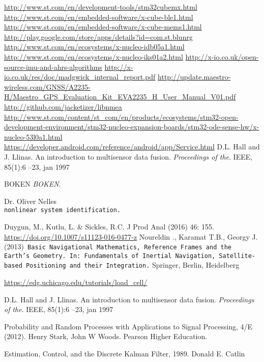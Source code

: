 \begin{thebibliography}{9}
\label{sec:ref}

  \url{http://www.st.com/en/development-tools/stm32cubemx.html}
  \url{http://www.st.com/en/embedded-software/x-cube-ble1.html}
  \url{http://www.st.com/en/embedded-software/x-cube-mems1.html}
  \url{http://play.google.com/store/apps/details?id=com.st.blunrg}
  \url{http://www.st.com/en/ecosystems/x-nucleo-idb05a1.html}
  \url{http://www.st.com/en/ecosystems/x-nucleo-iks01a2.html}
  \url{http://x-io.co.uk/open-source-imu-and-ahrs-algorithms}
  \url{http://x-io.co.uk/res/doc/madgwick_internal_report.pdf}
  \url{http://update.maestro-wireless.com/GNSS/A2235-H/Maestro_GPS_Evaluation_Kit_EVA2235_H_User_Manual_V01.pdf}
  \url{http://github.com/jacketizer/libnmea}
  \url{http://www.st.com/content/st_com/en/products/ecosystems/stm32-open-development-environment/stm32-nucleo-expansion-boards/stm32-ode-sense-hw/x-nucleo-53l0a1.html}
  \url{https://developer.android.com/reference/android/app/Service.html}
D.L. Hall and J. Llinas. An introduction to multisensor data fusion. 
\textit{Proceedings of the}. IEEE, 85(1):6 –23, jan 1997

 
BOKEN
\textit{BOKEN}. 

 
Dr. Oliver Nelles
\\\texttt{nonlinear system identification.}

Duygun, M., Kutlu, L. \& Sickles, R.C. J Prod Anal (2016) 46: 155. \url{https://doi.org/10.1007/s11123-016-0477-z}
Noureldin ., Karamat T.B., Georgy J. (2013)\texttt{ Basic Navigational Mathematics, Reference Frames and the Earth’s Geometry. In: Fundamentals of Inertial Navigation, Satellite-based Positioning and their Integration.} Springer, Berlin, Heidelberg

  \url{https://edg.uchicago.edu/tutorials/load_cell/}

D.L. Hall and J. Llinas. An introduction to multisensor data fusion. 
\textit{Proceedings of
the}. IEEE, 85(1):6 –23, jan 1997

Probability and Random Processes with Applications to Signal Processing, 4/E (2012). 
Henry Stark, John W Woods. Pearson Higher Education. 

Estimation, Control, and the Discrete Kalman Filter, 1989. Donald E. Catlin


\end{thebibliography}

